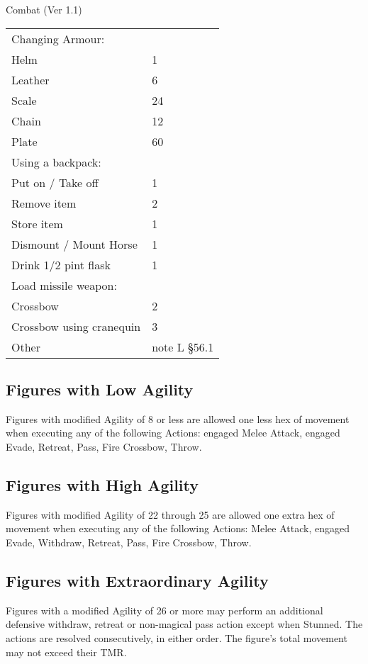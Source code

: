 \begin{Chapter}{Combat (Ver 1.1)}
\begin{tabularx}{\columnwidth}{Xp{16mm}}
Changing Armour:			& \\ 
Helm						& 1 \\
Leather						& 6 \\
Scale						& 24 \\
Chain						& 12 \\
Plate						& 60 \\
Using a backpack:				& \\
Put on / Take off				& 1 \\
Remove item					& 2 \\
Store item					& 1 \\
Dismount / Mount Horse				& 1 \\
Drink 1/2 pint flask				& 1 \\
Load missile weapon:				& \\
Crossbow					& 2 \\
Crossbow using cranequin			& 3 \\
Other						& note L §56.1 \\
\end{tabularx}


\subsection{Figures with Low Agility}

Figures with modified Agility of 8 or less are allowed one less hex of
movement when executing any of the following Actions: engaged Melee
Attack, engaged Evade, Retreat, Pass, Fire Crossbow, Throw.

\subsection{Figures with High Agility}

Figures with modified Agility of 22 through 25 are allowed one extra
hex of movement when executing any of the following Actions: Melee
Attack, engaged Evade, Withdraw, Retreat, Pass, Fire Crossbow, Throw.

\subsection{Figures with Extraordinary Agility}

Figures with a modified Agility of 26 or more may perform an
additional defensive withdraw, retreat or non-magical pass action
except when Stunned.  The actions are resolved consecutively, in
either order.  The figure’s total movement may not exceed their TMR.


\end{Chapter}
